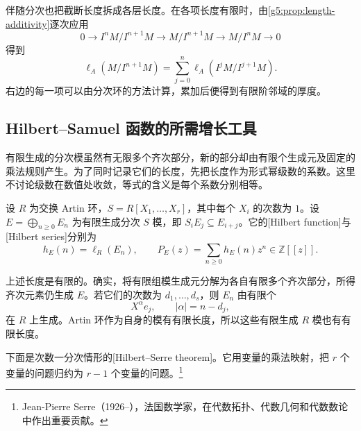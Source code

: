 \ProseParagraphBreak

伴随分次也把截断长度拆成各层长度。在各项长度有限时，由\cref{g5:prop:length-additivity}逐次应用
\[
	0\longrightarrow I^nM/I^{n+1}M
	\longrightarrow M/I^{n+1}M
	\longrightarrow M/I^nM\longrightarrow0
\]
得到
\begin{equation}\label{g5:eq:truncation-graded-length}
	\ell_A(M/I^{n+1}M)
	=\sum_{j=0}^n\ell_A(I^jM/I^{j+1}M).
\end{equation}
右边的每一项可以由分次环的方法计算，累加后便得到有限阶邻域的厚度。

\subsection{Hilbert–Samuel 函数的所需增长工具}
\label{g5:subsec:0701:04}

有限生成的分次模虽然有无限多个齐次部分，新的部分却由有限个生成元及固定的乘法规则产生。为了同时记录它们的长度，先把长度作为形式幂级数的系数。这里不讨论级数在数值处收敛，等式的含义是每个系数分别相等。

\begin{definition}\label{g5:def:hilbert-series}
	设 \(R\) 为交换 Artin 环，\(S=R[X_1,\ldots,X_r]\)，其中每个 \(X_i\) 的次数为 \(1\)。设
	\(E=\bigoplus_{n\geq0}E_n\) 为有限生成分次 \(S\) 模，即 \(S_iE_j\subseteq E_{i+j}\)。它的[Hilbert function]与[Hilbert series]分别为
	\[
		h_E(n)=\ell_R(E_n),\qquad
		P_E(z)=\sum_{n\geq0}h_E(n)z^n\in\mathbb Z[[z]].
	\]
\end{definition}

上述长度是有限的。确实，将有限组模生成元分解为各自有限多个齐次部分，所得齐次元素仍生成 \(E\)。若它们的次数为 \(d_1,\ldots,d_s\)，则 \(E_n\) 由有限个
\[
	X^\alpha e_j,\qquad |\alpha|=n-d_j,
\]
在 \(R\) 上生成。Artin 环作为自身的模有有限长度，所以这些有限生成 \(R\) 模也有有限长度。

\ProseParagraphBreak

下面是次数一分次情形的[Hilbert--Serre theorem]。它用变量的乘法映射，把 \(r\) 个变量的问题归约为 \(r-1\) 个变量的问题。\footnote{Jean-Pierre Serre（1926--），法国数学家，在代数拓扑、代数几何和代数数论中作出重要贡献。}

